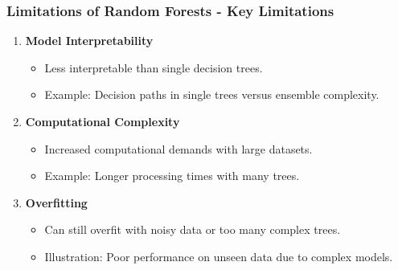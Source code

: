 \documentclass[aspectratio=169]{beamer}
\begin{document}
\begin{frame}[fragile]
    \frametitle{Limitations of Random Forests - Key Limitations}
    \begin{enumerate}
        \item \textbf{Model Interpretability}
        \begin{itemize}
            \item Less interpretable than single decision trees. 
            \item Example: Decision paths in single trees versus ensemble complexity.
        \end{itemize}
        
        \item \textbf{Computational Complexity}
        \begin{itemize}
            \item Increased computational demands with large datasets.
            \item Example: Longer processing times with many trees.
        \end{itemize}
        
        \item \textbf{Overfitting}
        \begin{itemize}
            \item Can still overfit with noisy data or too many complex trees.
            \item Illustration: Poor performance on unseen data due to complex models.
        \end{itemize}
    \end{enumerate}
\end{frame}
\end{document}
